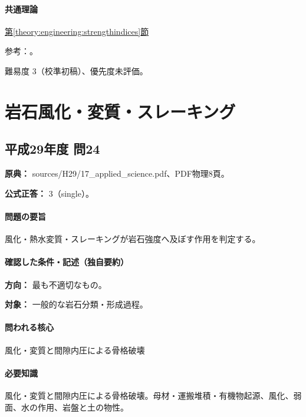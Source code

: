 \paragraph{共通理論} \hyperref[theory:engineering:strengthindices]{第\ref*{theory:engineering:strengthindices}節}

\par 参考：\cite{jseg_engineering_faq,geebec_ps}。

\par 難易度 3（校準初稿）、優先度未評価。

\section{岩石風化・変質・スレーキング}

\subsection{平成29年度 問24}
\label{q:h29-reg-applied-24}

\noindent\textbf{原典：} sources/H29/17\_applied\_science.pdf、PDF物理8頁。

\textbf{公式正答：} 3（single）。

\paragraph{問題の要旨} 風化・熱水変質・スレーキングが岩石強度へ及ぼす作用を判定する。

\paragraph{確認した条件・記述（独自要約）}\mbox{}\par

\noindent\textbf{方向：} 最も不適切なもの。\par

\noindent\textbf{対象：} 一般的な岩石分類・形成過程。\par

\paragraph{問われる核心} 風化・変質と間隙内圧による骨格破壊

\paragraph{必要知識} 風化・変質と間隙内圧による骨格破壊。母材・運搬堆積・有機物起源、風化、弱面、水の作用、岩盤と土の物性。


